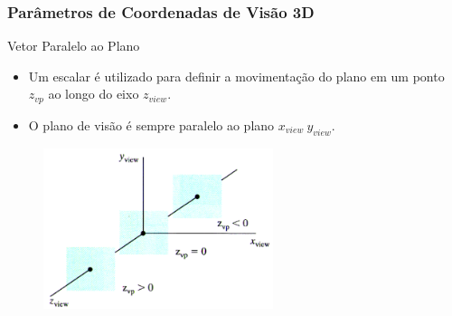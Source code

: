 \documentclass{beamer}
\begin{document}
\begin{frame}
\frametitle{Parâmetros de Coordenadas de Visão 3D}
	\begin{block}{Vetor Paralelo ao Plano}
		\begin{itemize}
			\item Um escalar é utilizado para definir a movimentação do plano em um ponto $z_{vp}$ ao longo do eixo $z_{view}$.
			\item O plano de visão é sempre paralelo ao plano $x_{view} \: y_{view}$.
		\end{itemize}
	\end{block}
	
	\begin{figure}[!h]
			\begin{center}
			\includegraphics[width=0.6\textwidth]{Figures/MovPla}
			\end{center}
	\end{figure}
\end{frame}
\end{document}
